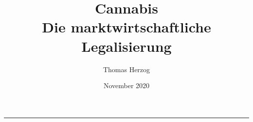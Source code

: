 \documentclass[a4paper, 12pt]{article}
\title{{\huge Cannabis}\\ Die marktwirtschaftliche Legalisierung}
\author{Thomas Herzog}
\date{November 2020}
\begin{document}
	\maketitle
	\hrule
	\pagebreak
	
	
	\pagebreak
	
	
	\pagebreak
	
	
	\pagebreak
	
	
	\pagebreak
	
	
	\pagebreak
	
	
	\pagebreak
	
	
	\pagebreak
	
	
	\pagebreak
	
	
	\pagebreak
	
	
	
\end{document}
